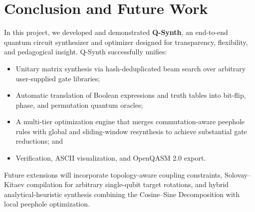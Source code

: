 \documentclass[11pt]{article}
\begin{document}
\section{Conclusion and Future Work}
In this project, we developed and demonstrated \textbf{Q-Synth}, an end-to-end quantum circuit synthesizer and optimizer designed for transparency, flexibility, and pedagogical insight. Q-Synth successfully unifies:
\begin{itemize}[leftmargin=*]
    \item Unitary matrix synthesis via hash-deduplicated beam search over arbitrary user-supplied gate libraries;
    \item Automatic translation of Boolean expressions and truth tables into bit-flip, phase, and permutation quantum oracles;
    \item A multi-tier optimization engine that merges commutation-aware peephole rules with global and sliding-window resynthesis to achieve substantial gate reductions; and
    \item Verification, ASCII visualization, and OpenQASM 2.0 export.
\end{itemize}

Future extensions will incorporate topology-aware coupling constraints, Solovay--Kitaev compilation for arbitrary single-qubit target rotations, and hybrid analytical-heuristic synthesis combining the Cosine--Sine Decomposition with local peephole optimization.
\end{document}
